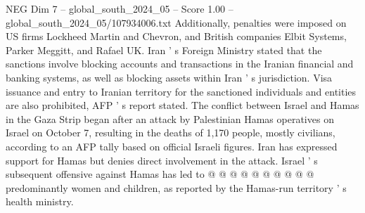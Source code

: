 \begin{textsample}{NEG Dim 7 – global\_south\_2024\_05 – Score 1.00 – global\_south\_2024\_05/107934006.txt}
Additionally, penalties were imposed on US firms Lockheed Martin and Chevron, and British companies Elbit Systems, Parker Meggitt, and Rafael UK.
Iran ' s Foreign Ministry stated that the sanctions involve blocking accounts and transactions in the Iranian financial and banking systems, as well as blocking assets within Iran ' s jurisdiction.
Visa issuance and entry to Iranian territory for the sanctioned individuals and entities are also prohibited, AFP ' s report stated.
The conflict between Israel and Hamas in the Gaza Strip began after an attack by Palestinian Hamas operatives on Israel on October 7, resulting in the deaths of 1,170 people, mostly civilians, according to an AFP tally based on official Israeli figures.
Iran has expressed support for Hamas but denies direct involvement in the attack.
Israel ' s subsequent offensive against Hamas has led to @ @ @ @ @ @ @ @ @ @ predominantly women and children, as reported by the Hamas-run territory ' s health ministry.

\end{textsample}
